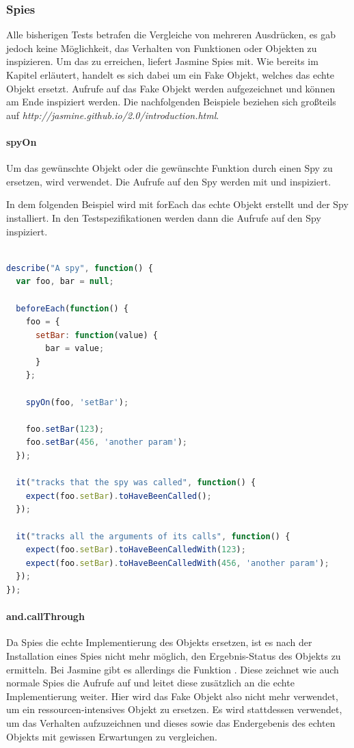 {\subsubsection{Spies}
Alle bisherigen Tests betrafen die Vergleiche von mehreren Ausdrücken, es gab jedoch keine Möglichkeit, das Verhalten von Funktionen oder Objekten zu inspizieren. Um das zu erreichen, liefert Jasmine Spies mit. Wie bereits im Kapitel  erläutert, handelt es sich dabei um ein Fake Objekt, welches das echte Objekt ersetzt. Aufrufe auf das Fake Objekt werden aufgezeichnet und können am Ende inspiziert werden. Die nachfolgenden Beispiele beziehen sich großteils auf \textit{http://jasmine.github.io/2.0/introduction.html}.

\paragraph{spyOn}
Um das gewünschte Objekt oder die gewünschte Funktion durch einen Spy zu ersetzen, wird  verwendet. Die Aufrufe auf den Spy werden mit  und  inspiziert.

In dem folgenden Beispiel wird mit forEach das echte Objekt erstellt und der Spy installiert. In den Testspezifikationen werden dann die Aufrufe auf den Spy inspiziert.

\begin{lstlisting}[language=JavaScript]

describe("A spy", function() {
  var foo, bar = null;

  beforeEach(function() {
    foo = {
      setBar: function(value) {
        bar = value;
      }
    };

    spyOn(foo, 'setBar');

    foo.setBar(123);
    foo.setBar(456, 'another param');
  });

  it("tracks that the spy was called", function() {
    expect(foo.setBar).toHaveBeenCalled();
  });

  it("tracks all the arguments of its calls", function() {
    expect(foo.setBar).toHaveBeenCalledWith(123);
    expect(foo.setBar).toHaveBeenCalledWith(456, 'another param');
  });
});

\end{lstlisting}

\paragraph{and.callThrough}
Da Spies die echte Implementierung des Objekts ersetzen, ist es nach der Installation eines Spies nicht mehr möglich, den Ergebnis-Status des Objekts zu ermitteln. Bei Jasmine gibt es allerdings die Funktion . Diese zeichnet wie auch normale Spies die Aufrufe auf und leitet diese zusätzlich an die echte Implementierung weiter. Hier wird das Fake Objekt also nicht mehr verwendet, um ein ressourcen-intensives Objekt zu ersetzen. Es wird stattdessen verwendet, um das Verhalten aufzuzeichnen und dieses sowie das Endergebenis des echten Objekts mit gewissen Erwartungen zu vergleichen.

}
